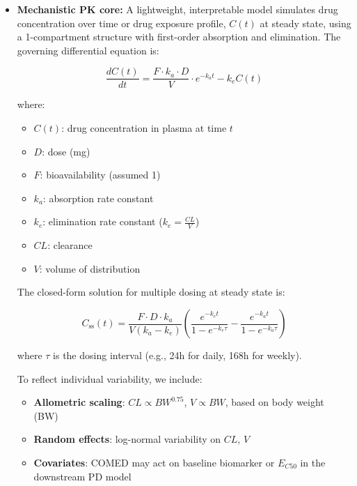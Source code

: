 \documentclass[11pt]{article}
\begin{document}
\begin{itemize}
    \item \textbf{Mechanistic PK core:} A lightweight, interpretable model simulates drug concentration over time or drug exposure profile, \(C(t)\) at steady state, using a 1-compartment structure with first-order absorption and elimination. The governing differential equation is:

    \begin{equation}
        \frac{dC(t)}{dt} = \frac{F \cdot k_a \cdot D}{V} \cdot e^{-k_a t} - k_e C(t)
    \end{equation}

    where:
    \begin{itemize}[noitemsep]
        \item \( C(t) \): drug concentration in plasma at time \( t \)
        \item \( D \): dose (mg)
        \item \( F \): bioavailability (assumed 1)
        \item \( k_a \): absorption rate constant
        \item \( k_e \): elimination rate constant (\( k_e = \frac{CL}{V} \))
        \item \( CL \): clearance
        \item \( V \): volume of distribution
    \end{itemize}

    The closed-form solution for multiple dosing at steady state is:

    \begin{equation}
        C_{\text{ss}}(t) = \frac{F \cdot D \cdot k_a}{V(k_a - k_e)} \left( \frac{e^{-k_e t}}{1 - e^{-k_e \tau}} - \frac{e^{-k_a t}}{1 - e^{-k_a \tau}} \right)
    \end{equation}

    where \( \tau \) is the dosing interval (e.g., 24h for daily, 168h for weekly).

    To reflect individual variability, we include:
    \begin{itemize}
        \item \textbf{Allometric scaling}: \( CL \propto BW^{0.75} \), \( V \propto BW \), based on body weight (BW)
        \item \textbf{Random effects}: log-normal variability on \( CL \), \( V \)
        \item \textbf{Covariates}: COMED may act on baseline biomarker or \( E_{C50} \) in the downstream PD model
    \end{itemize}


\end{itemize}
\end{document}
